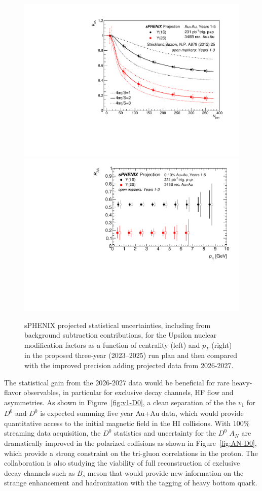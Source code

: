 \begin{figure}
    \centering
    \includegraphics[width=0.44\linewidth]{figs/upsilon_centrality_3yrs_5yrs_comparison.pdf}
    \includegraphics[width=0.47\linewidth]{figs/upsilon_RAA_2}
    \caption{sPHENIX projected statistical uncertainties,  including from background subtraction contributions, for the Upsilon nuclear modification factors as a function of centrality (left) and $p_T$ (right) in the proposed three-year (2023–2025) run plan and then compared with the improved precision adding projected data from 2026-2027.}
    \label{fig:RAA_upsilon_extrayears}
\end{figure}

The statistical gain from the 2026-2027 data would be beneficial for rare heavy-flavor observables, in particular for exclusive decay channels, HF flow and asymmetries. As shown in Figure~\ref{fig:v1-D0}, a clean separation of the the $v_1$ for $D^0$ and $\bar{D^0}$ is expected summing five year Au+Au data, which would provide quantitative access to the initial magnetic field in the HI collisions. With 100\% streaming data acquisition, the $D^0$ statistics and uncertainty for the $D^0$ $A_N$ are dramatically improved in the polarized \pp collisions as shown in Figure~\ref{fig:AN-D0}, which provide a strong constraint on the tri-gluon correlations in the proton. 
The collaboration is also studying the viability of full reconstruction of exclusive decay channels such as $B_s$ meson that would provide new information on the strange enhancement and hadronization with the tagging of heavy bottom quark.  
 
